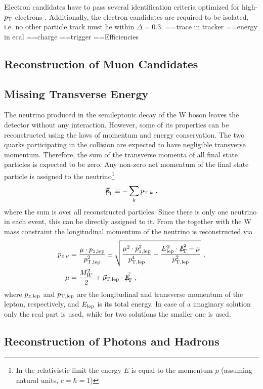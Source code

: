 \noindent Electron candidates have to pass several identification criteria optimized for high-$p_{\rm T}$ electrons \cite{elreq}. Additionally, the electron candidates are required to be isolated, i.e. no other particle track must lie within $\Delta=0.3$.
==trace in tracker
==energy in ecal
==charge
==trigger
==Efficiencies
\subsection{Reconstruction of Muon Candidates}
\subsection{Missing Transverse Energy}
The neutrino produced in the semileptonic decay of the W boson leaves the detector without any interaction. However, some of its properties can be reconstructed using the laws of momentum and energy conservation. The two quarks participating in the collision are expected to have negligible transverse momentum. Therefore, the sum of the transverse momenta of all final state particles is expected to be zero. Any non-zero net momentum of the final state particle is assigned to the neutrino\footnote{In the relativistic limit the energy $E$ is equal to the momentum $p$ (assuming natural units, $c=\hbar=1$)}\cite{MET}
\begin{equation}
{E\!\!\!\!/}_{\!\mathrm{T}} \equiv -\sum_k p_{{\rm T},k} ~,
\end{equation}
where the sum is over all reconstructed particles. Since there is only one neutrino in each event, this \MET can be directly assigned to it. From the \MET together with the W mass constraint the longitudinal momentum of the neutrino is reconstructed \cite{PAS} via
\begin{align}
p_{z,\nu} &= \frac{\mu \cdot p_{z,{\rm lep}}}{p_{\rm T,lep}^2} \pm \sqrt{\frac{\mu^2 \cdot p_{z,{\rm lep}}^2}{p_{\rm T,lep}^4} - \frac{E_{\rm lep}^2 \cdot \MET^2 - \mu}{p_{\rm T,lep}^2}} ~, \\
\mu &= \frac{M_W^2}{2} + \vec{p}_{\rm T,lep}\cdot \vec{\MET} ~,
\end{align} 
where $p_{z,{\rm lep}}$ and $p_{\rm T,lep}$ are the longitudinal  and transverse momentum of the lepton, respectively, and $E_{\rm lep}$ is its total energy. In case of a imaginary solution only the real part is used, while for two solutions the smaller one is used.
\subsection{Reconstruction of Photons and Hadrons}
